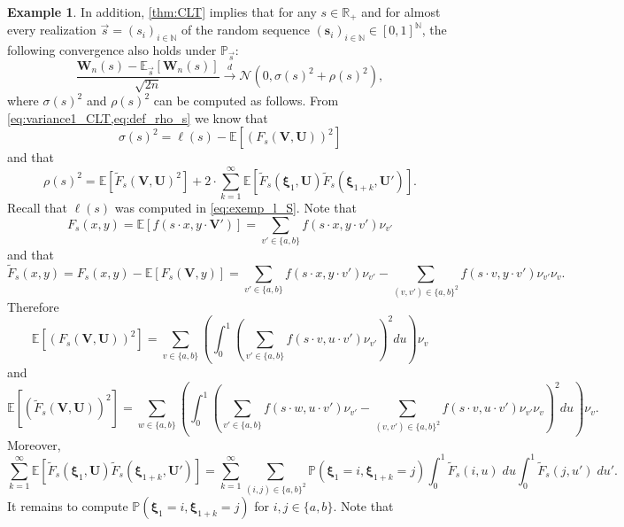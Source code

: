 \documentclass[11pt,a4paper,oneside]{article}
\theoremstyle{definition}
\newtheorem{exmp}[thm]{Example}
\theoremstyle{remark}
\def\N{\mathbb{N}}
\def\E{\mathbb{E}}
\def\P{\mathbb{P}}
\def\R{\mathbb{R}}
\begin{document}
\begin{exmp}
	In addition, \cref{thm:CLT} implies that for any $s\in\R_+$ and for almost every realization $\vec{s}=( s_i)_{{i\in\N}}$ of the random sequence $(\bm s_i)_{{i\in\N}}\in[0,1]^{\N}$, the following convergence also holds under $\P_{\vec{s}}$: 
	\begin{equation}
	\frac{\bm W_n(s)- \E_{\vec{s}}[\bm W_n(s)] }{\sqrt{2n}}\xrightarrow{d} \bm{\mathcal{N}}(0,\sigma(s)^2 + \rho(s)^2),
	\end{equation}
	where $\sigma(s)^2$ and $\rho(s)^2$ can be computed as follows. From \cref{eq:variance1_CLT,eq:def_rho_s} we know that
	\begin{equation}
		\sigma(s)^2=\ell(s)-\E\left[\left(F_s(\bm V,\bm U)\right)^2\right]
	\end{equation}
	and that
	\begin{equation}
		\rho(s)^2=  \E \left[ \tilde F_s (\bm V, \bm U)^2 \right] + 2 \cdot \sum_{k=1}^{\infty} \E\left[ \tilde F_s(\bm{\xi}_1, \bm U) \tilde F_s (\bm{\xi}_{1+k}, \bm U') \right].
	\end{equation}
	Recall that $\ell(s)$ was computed in \cref{eq:exemp_l_S}. Note that $$F_s(x,y)=\E\left[f\left(s\cdot x,y\cdot \bm V'\right)\right]=\sum_{v'\in \{a,b\}}f\left(s\cdot x,y\cdot v'\right)\nu_{v'}$$
	and that
	$$\tilde F_s(x,y)=F_s(x,y)-\E\left[F_s(\bm V,y)\right]=\sum_{v'\in\{a,b\}}f\left(s\cdot x,y\cdot v'\right)\nu_{v'}-\sum_{(v,v')\in \{a,b\}^2}f\left(s\cdot v,y\cdot v'\right)\nu_{v'}\nu_{v}.$$
	Therefore
	\begin{equation}
		\E\left[\left(F_s(\bm V,\bm U)\right)^2\right]=\sum_{v\in \{a,b\}}\left(\int_0^1\left(\sum_{v'\in\{a,b\}}f\left(s\cdot v,u\cdot v'\right)\nu_{v'}\right)^2du\right)\nu_{v}
	\end{equation}
	and 
	\begin{equation}
	\E\left[\left(\tilde F_s(\bm V,\bm U)\right)^2\right]=\sum_{w\in \{a,b\}}\left(\int_0^1\left(\sum_{v'\in\{a,b\}}f\left(s\cdot w,u\cdot v'\right)\nu_{v'}-\sum_{(v,v')\in \{a,b\}^2}f\left(s\cdot v,u\cdot v'\right)\nu_{v'}\nu_{v}\right)^2du\right)\nu_{v}.
	\end{equation}
	Moreover,
	\begin{equation}
	\sum_{k=1}^{\infty} \E\left[ \tilde F_s(\bm{\xi}_1, \bm U) \tilde F_s (\bm{\xi}_{1+k}, \bm U') \right]=	\sum_{k=1}^{\infty}  \sum_{(i,j)\in \{a,b\}^2}  \P(\bm{\xi}_1=i,\bm{\xi}_{1+k}=j) \int_0^1 \tilde F_s(i, u)\; du \int_0^1 \tilde F_s (j, u') \; du'.
	\end{equation}
	It remains to compute $\P(\bm{\xi}_1=i,\bm{\xi}_{1+k}=j)$ for $i,j\in \{a,b\}$. Note that

\end{exmp}
\end{document}
